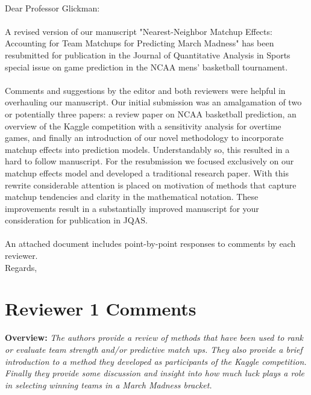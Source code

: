\documentclass[11pt]{article} %
\begin{document}
\\
Dear Professor Glickman:\\
\\ %
A revised version of our manuscript "Nearest-Neighbor Matchup Effects: Accounting for Team Matchups for Predicting March Madness" has been resubmitted for publication in the Journal of Quantitative Analysis in Sports special issue on game prediction in the NCAA mens' basketball tournament.\\
\\
Comments and suggestions by the editor and both reviewers were helpful in overhauling our manuscript. Our initial submission was an amalgamation of two or potentially three papers: a review paper on NCAA basketball prediction, an overview of the Kaggle competition with a sensitivity analysis for overtime games, and finally an introduction of our novel methodology to incorporate matchup effects into prediction models. Understandably so, this resulted in a hard to follow manuscript. For the resubmission we focused exclusively on our matchup effects model and developed a traditional research paper. With this rewrite considerable attention is placed on motivation of methods that capture matchup tendencies and clarity in the mathematical notation. These improvements result in a substantially improved manuscript for your consideration for publication in JQAS. \\
\\
An attached document includes point-by-point responses to comments by each reviewer.  
\\

Regards, %
\newpage

\section*{Reviewer 1 Comments}
{\bf Overview:} \emph{The authors provide a review of methods that have been used to rank or evaluate team strength and/or predictive match ups. They also provide a brief introduction to a method they developed as participants of the Kaggle competition. Finally they provide some discussion and insight into how much luck plays a role in selecting winning teams in a March Madness bracket.}\\
\\
\end{document}
